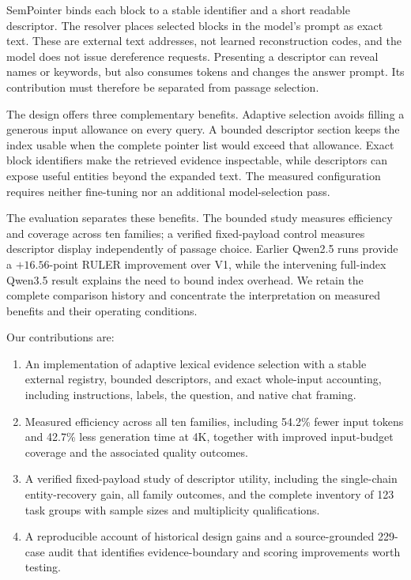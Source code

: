 \documentclass[runningheads]{llncs}
\begin{document}
SemPointer binds each block to a stable identifier and a short readable descriptor. The resolver places selected blocks in the model's prompt as exact text. These are external text addresses, not learned reconstruction codes, and the model does not issue dereference requests. Presenting a descriptor can reveal names or keywords, but also consumes tokens and changes the answer prompt. Its contribution must therefore be separated from passage selection.

The design offers three complementary benefits. Adaptive selection avoids filling a generous input allowance on every query. A bounded descriptor section keeps the index usable when the complete pointer list would exceed that allowance. Exact block identifiers make the retrieved evidence inspectable, while descriptors can expose useful entities beyond the expanded text. The measured configuration requires neither fine-tuning nor an additional model-selection pass.

The evaluation separates these benefits. The bounded study measures efficiency and coverage across ten families; a verified fixed-payload control measures descriptor display independently of passage choice. Earlier Qwen2.5 runs provide a $+16.56$-point RULER improvement over V1, while the intervening full-index Qwen3.5 result explains the need to bound index overhead. We retain the complete comparison history and concentrate the interpretation on measured benefits and their operating conditions.

Our contributions are:
\begin{enumerate}
\item An implementation of adaptive lexical evidence selection with a stable external registry, bounded descriptors, and exact whole-input accounting, including instructions, labels, the question, and native chat framing.
\item Measured efficiency across all ten families, including 54.2\% fewer input tokens and 42.7\% less generation time at 4K, together with improved input-budget coverage and the associated quality outcomes.
\item A verified fixed-payload study of descriptor utility, including the single-chain entity-recovery gain, all family outcomes, and the complete inventory of 123 task groups with sample sizes and multiplicity qualifications.
\item A reproducible account of historical design gains and a source-grounded 229-case audit that identifies evidence-boundary and scoring improvements worth testing.
\end{enumerate}
\end{document}
